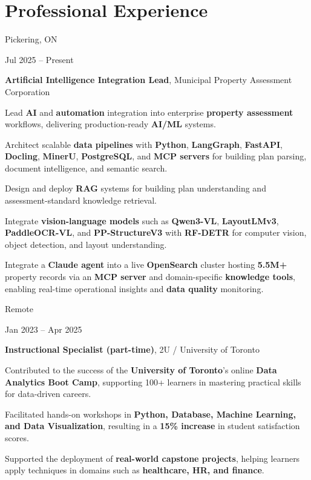 \vspace{-0.2 cm}
\section{Professional Experience}

\begin{twocolentry}{
    Pickering, ON 

    Jul 2025 – Present
}
    \textbf{Artificial Intelligence Integration Lead}, Municipal Property Assessment Corporation


\begin{highlights}
    \item Lead \textbf{AI} and \textbf{automation} integration into enterprise \textbf{property assessment} workflows, delivering production-ready \textbf{AI/ML} systems.
    \item Architect scalable \textbf{data pipelines} with \textbf{Python}, \textbf{LangGraph}, \textbf{FastAPI}, \textbf{Docling}, \textbf{MinerU}, \textbf{PostgreSQL}, and \textbf{MCP servers} for building plan parsing, document intelligence, and semantic search.
    \item Design and deploy \textbf{RAG} systems for building plan understanding and assessment-standard knowledge retrieval.
    \item Integrate \textbf{vision-language models} such as \textbf{Qwen3-VL}, \textbf{LayoutLMv3}, \textbf{PaddleOCR-VL}, and \textbf{PP-StructureV3} with \textbf{RF-DETR} for computer vision, object detection, and layout understanding.
    \item Integrate a \textbf{Claude agent} into a live \textbf{OpenSearch} cluster hosting \textbf{5.5M+} property records via an \textbf{MCP server} and domain-specific \textbf{knowledge tools}, enabling real-time operational insights and \textbf{data quality} monitoring.
\end{highlights}



\end{twocolentry}


\vspace{0.2 cm}
\begin{twocolentry}{
    Remote

    Jan 2023 – Apr 2025
}
    \textbf{Instructional Specialist (part-time)}, 2U / University of Toronto

    \begin{highlights}
        \item Contributed to the success of the \textbf{University of Toronto}'s online \textbf{Data Analytics Boot Camp}, supporting 100+ learners in mastering practical skills for data-driven careers.
        \item Facilitated hands-on workshops in \textbf{Python, Database, Machine Learning, and Data Visualization}, resulting in a \textbf{15\% increase} in student satisfaction scores.
        \item Supported the deployment of \textbf{real-world capstone projects}, helping learners apply techniques in domains such as \textbf{healthcare, HR, and finance}.
    \end{highlights}
\end{twocolentry}

